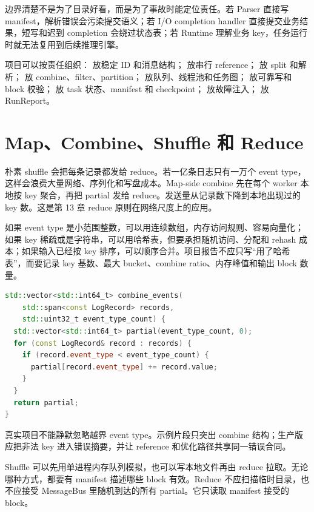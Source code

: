 边界清楚不是为了目录好看，而是为了事故时能定位责任。若 Parser 直接写 manifest，解析错误会污染提交语义；若 I/O completion handler 直接提交业务结果，短写和迟到 completion 会绕过状态表；若 Runtime 理解业务 key，任务运行时就无法复用到后续推理引擎。

项目可以按责任组织： 放稳定 ID 和消息结构； 放串行 reference； 放 split 和解析； 放 combine、filter、partition； 放队列、线程池和任务图； 放可靠写和 block 校验； 放 task 状态、manifest 和 checkpoint； 放故障注入； 放 RunReport。

\section{Map、Combine、Shuffle 和 Reduce}

朴素 shuffle 会把每条记录都发给 reduce。若一亿条日志只有一万个 event type，这样会浪费大量网络、序列化和写盘成本。Map-side combine 先在每个 worker 本地按 key 聚合，再把 partial 发给 reduce。发送量从记录数下降到本地出现过的 key 数。这是第 13 章 reduce 原则在网络尺度上的应用。

如果 event type 是小范围整数，可以用连续数组，内存访问规则、容易向量化；如果 key 稀疏或是字符串，可以用哈希表，但要承担随机访问、分配和 rehash 成本；如果输入已经按 key 排序，可以顺序合并。项目报告不应只写“用了哈希表”，而要记录 key 基数、最大 bucket、combine ratio、内存峰值和输出 block 数量。

\begin{lstlisting}[language=C++,caption={小整数 key 的本地 combine}]
std::vector<std::int64_t> combine_events(
    std::span<const LogRecord> records,
    std::uint32_t event_type_count) {
  std::vector<std::int64_t> partial(event_type_count, 0);
  for (const LogRecord& record : records) {
    if (record.event_type < event_type_count) {
      partial[record.event_type] += record.value;
    }
  }
  return partial;
}
\end{lstlisting}

真实项目不能静默忽略越界 event type。示例片段只突出 combine 结构；生产版应把非法 key 进入错误摘要，并让 reference 和优化路径共享同一错误合同。

Shuffle 可以先用单进程内存队列模拟，也可以写本地文件再由 reduce 拉取。无论哪种方式，都要有 manifest 描述哪些 block 有效。Reduce 不应扫描临时目录，也不应接受 MessageBus 里随机到达的所有 partial。它只读取 manifest 接受的 block。

